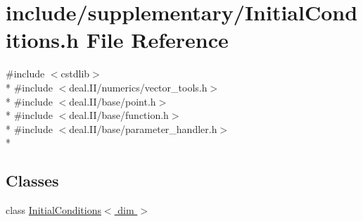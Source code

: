 \section{include/supplementary/\-Initial\-Conditions.h File Reference}
\label{_initial_conditions_8h}
{\ttfamily \#include $<$cstdlib$>$}\\*
{\ttfamily \#include $<$deal.\-I\-I/numerics/vector\-\_\-tools.\-h$>$}\\*
{\ttfamily \#include $<$deal.\-I\-I/base/point.\-h$>$}\\*
{\ttfamily \#include $<$deal.\-I\-I/base/function.\-h$>$}\\*
{\ttfamily \#include $<$deal.\-I\-I/base/parameter\-\_\-handler.\-h$>$}\\*
\subsection*{Classes}
\begin{DoxyCompactItemize}
\item 
class \hyperlink{class_initial_conditions}{Initial\-Conditions$<$ dim $>$}
\end{DoxyCompactItemize}
